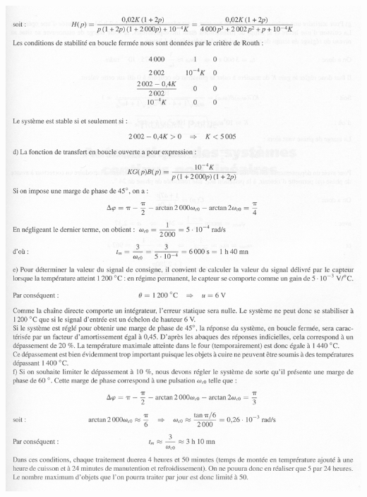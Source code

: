 \ifprof
\newpage
\begin{center}
\includegraphics[width=\linewidth]{images/cor_01}
\end{center}
\else
\fi

